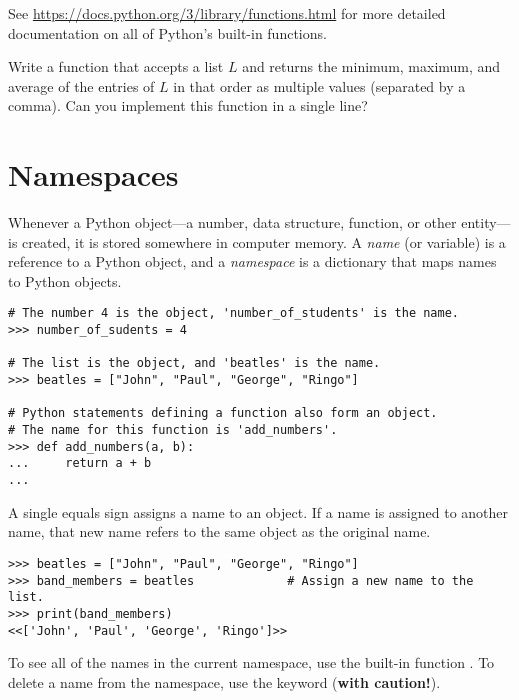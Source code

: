 See \url{https://docs.python.org/3/library/functions.html} for more detailed documentation on all of Python's built-in functions.

\begin{problem} %
Write a function that accepts a list $L$ and returns the minimum, maximum, and average of the entries of $L$ in that order as multiple values (separated by a comma).
Can you implement this function in a single line?
\end{problem}

\section*{Namespaces} %

Whenever a Python object---a number, data structure, function, or other entity---is created, it is stored somewhere in computer memory.
A \emph{name} (or variable) is a reference to a Python object, and a \emph{namespace} is a dictionary that maps names to Python objects.

\begin{lstlisting}
# The number 4 is the object, 'number_of_students' is the name.
>>> number_of_sudents = 4

# The list is the object, and 'beatles' is the name.
>>> beatles = ["John", "Paul", "George", "Ringo"]

# Python statements defining a function also form an object.
# The name for this function is 'add_numbers'.
>>> def add_numbers(a, b):
...     return a + b
...
\end{lstlisting}

A single equals sign assigns a name to an object.
If a name is assigned to another name, that new name refers to the same object as the original name.

\begin{lstlisting}
>>> beatles = ["John", "Paul", "George", "Ringo"]
>>> band_members = beatles             # Assign a new name to the list.
>>> print(band_members)
<<['John', 'Paul', 'George', 'Ringo']>>
\end{lstlisting}

To see all of the names in the current namespace, use the built-in function .
To delete a name from the namespace, use the  keyword (\textbf{with caution!}).

